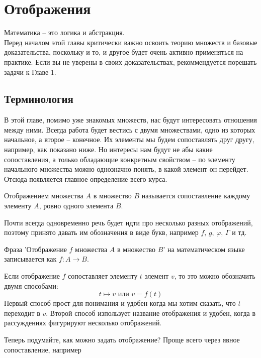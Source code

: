 \chapter{Отображения}
\begin{commentary}
Математика -- это логика и абстракция.\\
Перед началом этой главы критически важно освоить теорию множеств и базовые доказательства, поскольку и то, и другое будет очень активно применяться на практике. Если вы не уверены в своих доказательствах, рекоммендуется порешать задачи к Главе 1.
\end{commentary}
\section{Терминология}
В этой главе, помимо уже знакомых множеств, нас будут интересовать отношения между ними. Всегда работа будет вестись с двумя множествами, одно из которых начальное, а второе -- конечное. Их элементы мы будем сопоставлять друг другу, например, как показано ниже.
Но интересы нам будут не абы какие сопоставления, а только обладающие конкретным свойством -- по элементу начального множества можно однозначно понять, в какой элемент он перейдет. Отсюда появляется главное определение всего курса.
\begin{definition}\label{def:map}
Отображением множества $A$ в множество $B$ называется сопоставление каждому элементу $A$, ровно одного элемента $B$.

Почти всегда одновременно речь будет идти про несколько разных отображений, поэтому принято давать им обозначения в виде букв, например  $f,\,g,\,\varphi,\,\Gamma$ и тд.

Фраза 'Отображение $f$ множества $A$ в множество $B$' на математическом языке записывается как $f:A\rightarrow B$.
\end{definition}
Если отображение $f$ сопоставляет элементу $t$ элемент $v$, то это можно обозначить двумя способами:
\[t\mapsto v\text{ или } v=f(t)\]
Первый способ прост для понимания и удобен когда мы хотим сказать, что $t$ переходит в $v$. Второй способ изпользует название отображения и удобен, когда в рассуждениях фигурируют несколько отображений.

Теперь подумайте, как можно задать отображение? Проще всего через явное сопоставление, например


